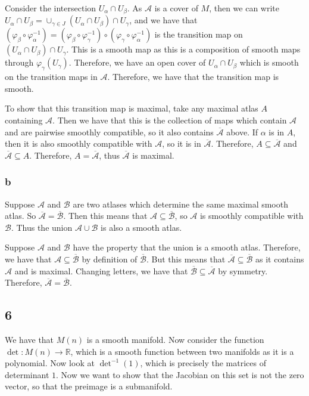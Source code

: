 \documentclass{article}
\theoremstyle{definition}
\numberwithin{theorem}{section}
\numberwithin{equation}{section}
\newcommand{\atlas}{\mathcal{A}}
\begin{document}
Consider the intersection $U_\alpha \cap U_\beta$. As $\atlas$ is a cover of $M$, then we can write $U_\alpha \cap U_\beta = \cup_{\gamma \in J} (U_\alpha \cap U_\beta) \cap U_\gamma$, and we have that $(\varphi_\beta \circ \varphi_\alpha^{-1}) = (\varphi_\beta \circ \varphi_\gamma^{-1}) \circ (\varphi_\gamma \circ \varphi_\alpha^{-1})$ is the transition map on $(U_\alpha \cap U_\beta) \cap U_\gamma$. This is a smooth map as this is a composition of smooth maps through $\varphi_\gamma(U_\gamma)$. Therefore, we have an open cover of $U_\alpha \cap U_\beta$ which is smooth on the transition maps in $\atlas$. Therefore, we have that the transition map is smooth.

To show that this transition map is maximal, take any maximal atlas $A$ containing $\atlas$. Then we have that this is the collection of maps which contain $\atlas$ and are pairwise smoothly compatible, so it also contains $\overline{\atlas}$ above. If $\alpha$ is in $A$, then it is also smoothly compatible with $\atlas$, so it is in $\overline{\atlas}$. Therefore, $A \subseteq \overline{\atlas}$ and $\overline{\atlas} \subseteq A$. Therefore, $A = \overline{\atlas}$, thus $\overline{\atlas}$ is maximal. 
\subsubsection{b}

Suppose $\mathcal{A}$ and $\mathcal{B}$ are two atlases which determine the same maximal smooth atlas. So $\overline{\mathcal{A}} = \overline{\mathcal{B}}$. Then this means that $\mathcal{A} \subseteq \overline{\mathcal{B}}$, so $\mathcal{A}$ is smoothly compatible with $\mathcal{B}$. Thus the union $\mathcal{A} \cup \mathcal{B}$ is also a smooth atlas. 

Suppose $\mathcal{A}$ and $\mathcal{B}$ have the property that the union is a smooth atlas. Therefore, we have that $\mathcal{A} \subseteq \overline{\mathcal{B}}$ by definition of $\overline{\mathcal{B}}$. But this means that $\overline{\mathcal{A}} \subseteq \overline{\mathcal{B}}$ as it contains $\mathcal{A}$ and is maximal. Changing letters, we have that $\overline{\mathcal{B}} \subseteq \overline{\mathcal{A}}$ by symmetry. Therefore, $\overline{\mathcal{A}} = \overline{\mathcal{B}}$.

\subsection{6}
We have that $M(n)$ is a smooth manifold. Now consider the function $\det : M(n) \rightarrow \mathbb{R}$, which is a smooth function between two manifolds as it is a polynomial. Now look at $\det^{-1} (1)$, which is precisely the matrices of determinant $1$. Now we want to show that the Jacobian on this set is not the zero vector, so that the preimage is a submanifold. 
\end{document}
